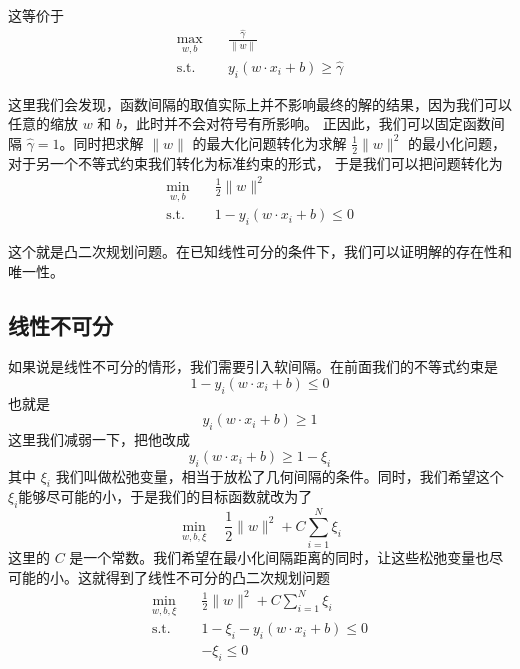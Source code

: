 这等价于
\begin{equation}
\begin{aligned}
\max_{w, b} \quad & \frac{\hat{\gamma}}{\|w\|} \\
\text{s.t.} \quad & y_i \left(w\cdot x_i + b\right) \geqslant \hat\gamma
\end{aligned}
\end{equation}

这里我们会发现，函数间隔的取值实际上并不影响最终的解的结果，因为我们可以任意的缩放 $w$ 和 $b$，此时并不会对符号有所影响。
正因此，我们可以固定函数间隔 $\hat\gamma = 1$。同时把求解 $\|w\|$ 的最大化问题转化为求解 $\frac{1}{2} \|w\|^2$ 的最小化问题，
对于另一个不等式约束我们转化为标准约束的形式，
于是我们可以把问题转化为
\begin{equation}
\begin{aligned}
\min_{w, b} \quad & \frac{1}{2} \|w\|^2 \\
\text{s.t.} \quad & 1-y_i \left(w\cdot x_i + b\right) \leqslant 0
\end{aligned}
\end{equation}

这个就是凸二次规划问题。在已知线性可分的条件下，我们可以证明解的存在性和唯一性。

\subsection{线性不可分}

如果说是线性不可分的情形，我们需要引入软间隔。在前面我们的不等式约束是
\begin{equation}
1-y_i \left(w\cdot x_i + b\right) \leqslant 0
\end{equation}
也就是
\begin{equation}
y_i \left(w\cdot x_i + b\right) \geqslant 1
\end{equation}
这里我们减弱一下，把他改成
\begin{equation}
y_i \left(w\cdot x_i + b\right) \geqslant 1-\xi_i
\end{equation}
其中 $\xi_i$ 我们叫做松弛变量，相当于放松了几何间隔的条件。同时，我们希望这个 $\xi_i$能够尽可能的小，于是我们的目标函数就改为了
\begin{equation}
\min_{w, b, \xi} \quad\frac{1}{2} \|w\|^2 + C\sum_{i=1}^{N} \xi_i
\end{equation}
这里的 $C$ 是一个常数。我们希望在最小化间隔距离的同时，让这些松弛变量也尽可能的小。这就得到了线性不可分的凸二次规划问题
\begin{equation}
\begin{aligned}
\min_{w, b, \xi}\quad & \frac{1}{2} \|w\|^2 + C\sum_{i=1}^{N} \xi_i \\
\text{s.t.} \quad & 1-\xi_i-y_i \left(w\cdot x_i + b\right) \leqslant 0 \\
& -\xi_i \leqslant 0
\end{aligned}
\end{equation}

